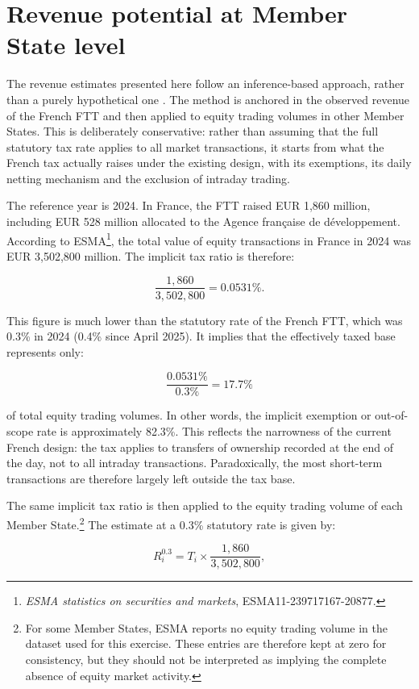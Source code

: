\documentclass[../../main]{subfiles}
\begin{document}
\section{Revenue potential at Member State level}

The revenue estimates presented here follow an inference-based approach, rather than a purely hypothetical one \citep{CapelleBlancardPersaud2025}. The method is anchored in the observed revenue of the French FTT and then applied to equity trading volumes in other Member States. This is deliberately conservative: rather than assuming that the full statutory tax rate applies to all market transactions, it starts from what the French tax actually raises under the existing design, with its exemptions, its daily netting mechanism and the exclusion of intraday trading.

The reference year is 2024. In France, the FTT raised EUR 1,860 million, including EUR 528 million allocated to the Agence française de développement. According to ESMA\footnote{\textit{ESMA statistics on securities and markets}, ESMA11-239717167-20877.}, the total value of equity transactions in France in 2024 was EUR 3,502,800 million. The implicit tax ratio is therefore:

\[
\frac{1,860}{3,502,800} = 0.0531\%.
\]

This figure is much lower than the statutory rate of the French FTT, which was 0.3\% in 2024 (0.4\% since April 2025). It implies that the effectively taxed base represents only:

\[
\frac{0.0531\%}{0.3\%} = 17.7\%
\]

\noindent of total equity trading volumes. In other words, the implicit exemption or out-of-scope rate is approximately 82.3\%. This reflects the narrowness of the current French design: the tax applies to transfers of ownership recorded at the end of the day, not to all intraday transactions. Paradoxically, the most short-term transactions are therefore largely left outside the tax base.

The same implicit tax ratio is then applied to the equity trading volume of each Member State.\footnote{For some Member States, ESMA reports no equity trading volume in the dataset used for this exercise. These entries are therefore kept at zero for consistency, but they should not be interpreted as implying the complete absence of equity market activity.} The estimate at a 0.3\% statutory rate is given by:

\[
R_i^{0.3} = T_i \times \frac{1,860}{3,502,800},
\]
\end{document}
